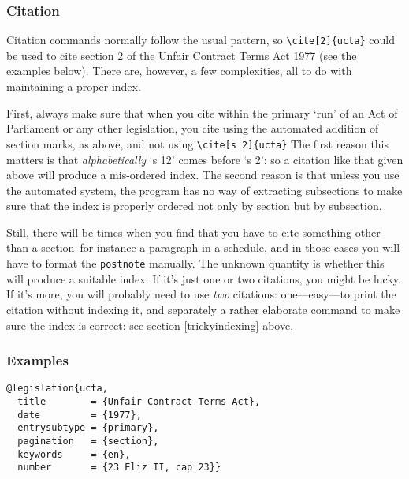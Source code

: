 \documentclass[a5paper,fontsize=9pt,DIV=1]{scrartcl}
\newcounter{egcounter}\setcounter{egcounter}{0}
\newenvironment{bibexample}[1][]{%
  \medskip\par\small\noindent\ignorespaces
  \marginpar{[\refstepcounter{egcounter}\arabic{egcounter}]\label{#1}}
  \begin{minipage}[t]{0.95\linewidth}}
 {\end{minipage}\par\medskip}
\begin{document}
\subsubsection{Citation}

Citation commands normally follow the usual pattern, so
\verb|\cite[2]{ucta}| could be used to cite section 2 of the Unfair
Contract Terms Act 1977 (see the examples below). There are, however,
a few complexities, all to do with maintaining a proper index.

First, always make sure that when you cite within the primary `run' of
an Act of Parliament or any other legislation, you cite using the automated addition of section
marks, as above, and not using \verb|\cite[s 2]{ucta}| The first reason
this matters is that \emph{alphabetically} `s 12' comes before `s
2': so a citation like that given above will produce a mis-ordered
index. The second reason is that unless you use the automated system,
the program has no way of extracting subsections to make sure that the
index is properly ordered not only by section but by subsection.

Still, there will be times when you find that you have to cite
something other than a section--for instance a paragraph in a
schedule, and in those cases you will have to format the
\texttt{postnote} manually. The unknown quantity is whether this will
produce a suitable index. If it's just one or two citations, you might
be lucky. If it's more, you will probably need to use \emph{two}
citations: one---easy---to print the citation without indexing it, and
separately a rather elaborate command to make sure the index is correct: see section \ref{trickyindexing} above.

\subsubsection{Examples}

\begin{bibexample}[ucta]
\begin{verbatim}
@legislation{ucta,
  title        = {Unfair Contract Terms Act},
  date         = {1977},
  entrysubtype = {primary},
  pagination   = {section},
  keywords     = {en},
  number       = {23 Eliz II, cap 23}}
\end{verbatim}
\end{bibexample}
\end{document}
